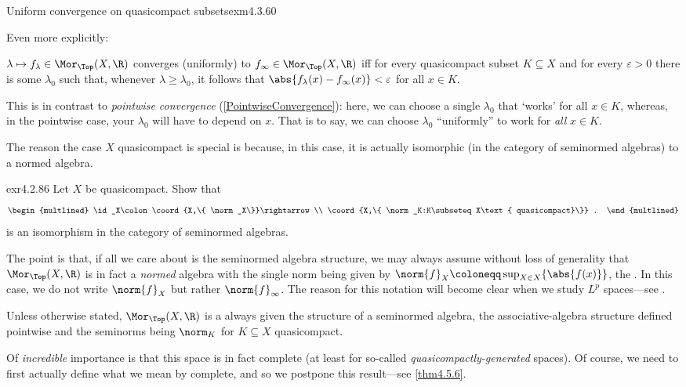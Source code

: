 \begin{exm}{Uniform convergence on quasicompact subsets}{exm4.3.60}
\begin{important}
\end{important}
Even more explicitly:
\begin{important}
$\lambda \mapsto f_{\lambda}\in \Mor _{\Top}(X,\R )$ converges (uniformly) to $f_{\infty}\in \Mor _{\Top}(X,\R )$ iff for every quasicompact subset $K\subseteq X$ and for every $\varepsilon >0$ there is some $\lambda _0$ such that, whenever $\lambda \geq \lambda _0$, it follows that $\abs{f_{\lambda}(x)-f_{\infty}(x)}<\varepsilon$ for all $x\in K$.
\end{important}
This is in contrast to \emph{pointwise convergence} (\cref{PointwiseConvergence}):  here, we can choose a single $\lambda _0$ that `works' for all $x\in K$, whereas, in the pointwise case, your $\lambda _0$ will have to depend on $x$.  That is to say, we can choose $\lambda _0$ ``uniformly'' to work for \emph{all} $x\in K$.

The reason the case $X$ quasicompact is special is because, in this case, it is actually isomorphic (in the category of seminormed algebras) to a normed algebra.
\begin{exr}[breakable=false]{}{exr4.2.86}
Let $X$ be quasicompact.  Show that
\begin{equation}
\begin{multlined}
\id _X\colon \coord{X,\{ \norm _X\}}\rightarrow \\ \coord{X,\{ \norm _K:K\subseteq X\text{ quasicompact}\}} .
\end{multlined}
\end{equation}
is an isomorphism in the category of seminormed algebras.
\begin{rmk}
The point is that, if all we care about is the seminormed algebra structure, we may always assume without loss of generality that $\Mor _{\Top}(X,\R )$ is in fact a \emph{normed} algebra with the single norm being given by $\norm{f}_X\coloneqq \sup _{X\in X}\{ \abs{f(x)}\}$, the .  In this case, we do not write $\norm{f}_X$ but rather $\norm{f}_\infty$.  The reason for this notation will become clear when we study $L^p$ spaces---see .
\end{rmk}
\end{exr}
\begin{important}
Unless otherwise stated, $\Mor _{\Top}(X,\R )$ is a always given the structure of a seminormed algebra, the associative-algebra structure defined pointwise and the seminorms being $\norm _K$ for $K\subseteq X$ quasicompact.
\end{important}

Of \emph{incredible} importance is that this space is in fact complete (at least for so-called \emph{quasicompactly-generated} spaces).  Of course, we need to first actually define what we mean by complete, and so we postpone this result---see \cref{thm4.5.6}.
\end{exm}
